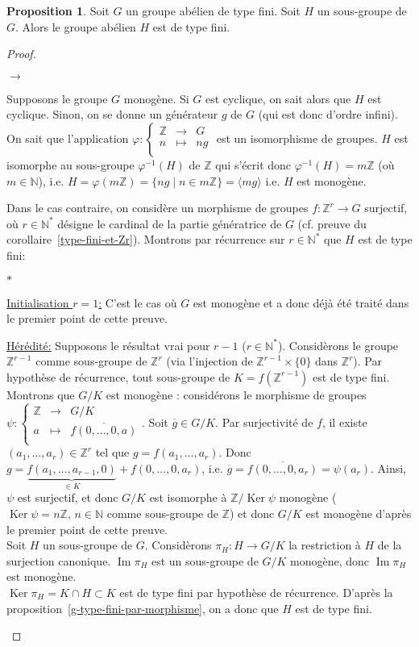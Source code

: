 \documentclass{report}
\newcommand{\Z}{\mathbb{Z}}
\newcommand{\N}{\mathbb{N}}
\newcommand{\im}{\mathop{\mathrm{Im}}\nolimits}
\renewcommand{\ker}{\mathop{\mathrm{Ker}}\nolimits}
\newenvironment{ls}{\begin{list}{$\to$}{}}{\end{list}}
\newenvironment{lls}{\begin{list}{$\ast$}{}}{\end{list}}
\theoremstyle{definition}
\newtheorem{prop}[defi]{Proposition}
\theoremstyle{remark}
\newcommand{\app}[5]{#1:\left\{\begin{array}{ccl}
#2 & \longrightarrow & #3 \\
#4 & \longmapsto & #5  \\
\end{array}\right.
}
\begin{document}
\begin{prop}
Soit $G$ un groupe abélien de type fini. Soit $H$ un sous-groupe de $G$. Alors le groupe abélien $H$ est de type fini.
\end{prop}

\begin{proof}\hspace{1em}
\begin{ls}
\item Supposons le groupe $G$ monogène. Si $G$ est cyclique, on sait alors que $H$ est cyclique. Sinon, on se donne un générateur $g$ de $G$ (qui est donc d'ordre infini). On sait que l'application $\app{\varphi}{\Z}{G}{n}{ng}$ est un isomorphisme de groupes. $H$ est isomorphe au sous-groupe $\varphi^{-1}(H)$ de $\Z$ qui s'écrit donc $\varphi^{-1}(H)=m\Z$ (où $m \in \N$), i.e. $H=\varphi(m\Z)=\{ng \mid n \in m\Z \}=\langle mg\rangle$ i.e. $H$ est monogène. 
\item Dans le cas contraire, on considère un morphisme de groupes $f:\Z^r\to G$ surjectif, où $r \in \N^*$ désigne le cardinal de la partie génératrice de $G$ (cf. preuve du corollaire~\ref{type-fini-et-Zr}). Montrons par récurrence sur $r \in \N^*$ que $H$ est de type fini:
\begin{lls}
	\item\underline{Initialisation $r=1$:} C'est le cas o\`u $G$ est monog\`ene et a donc d\'ej\`a été traité dans le premier point de cette preuve.
	\item\underline{H\'er\'edit\'e:} Supposons le résultat vrai pour $r-1$ ($r \in \N^*$). Considèrons le groupe $\Z^{r-1}$ comme sous-groupe de $\Z^r$ (via l'injection de $\Z^{r-1} \times \{0\}$ dans $\Z^{r}$). Par hypothèse de récurrence, tout sous-groupe de $K=f(\Z^{r-1})$ est de type fini. Montrons que $G/K$ est monogène : considérons le morphisme de groupes $\app{\psi}{\Z}{G/K}{a}{\overline{f(0, \ldots, 0,a)}}$. 
Soit $\overline{g} \in G/K$. Par surjectivité de $f$, il existe $(a_1, \ldots, a_r) \in \Z^r$ tel que $g=f(a_1, \ldots, a_r)$. Donc $g=\underbrace{f(a_1, \ldots, a_{r-1},0)}_{\in K}+f(0, \ldots, 0, a_r)$, i.e. $\overline{g}=\overline{f(0, \ldots, 0,a_r)}=\psi(a_r)$. Ainsi, $\psi$ est
surjectif, et donc $G/K$ est isomorphe \`a $\Z/\ker\psi$ monog\`ene ($\ker\psi=n\Z,\, n\in\N$ comme sous-groupe de $\Z$) et donc $G/K$ est monog\`ene d'apr\`es le premier point de cette preuve.\\
Soit $H$ un sous-groupe de $G$.
Considèrons $\pi_H:H\to G/K$ la restriction \`a $H$ de la surjection canonique. $\im \pi_H$ est un sous-groupe de $G/K$ monogène, donc $\im \pi_H$ est monogène.\\
$\ker \pi_H=K \cap H \subset K$ est de type fini par hypothèse de récurrence. D'après la proposition~\ref{g-type-fini-par-morphisme}, on a donc que $H$ est de type fini.
\end{lls}
\end{ls}
\end{proof}
\end{document}
